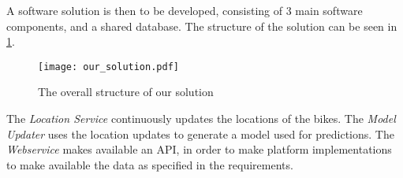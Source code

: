 A software solution is then to be developed, consisting of 3 main software components, and a shared database.
The structure of the solution can be seen in \cref{fig:solution_structure}.

\begin{figure}[h]
\texttt{[image: our\_solution.pdf]}
\caption{The overall structure of our solution}
\label{fig:solution_structure}
\end{figure}

The \textit{Location Service} continuously updates the locations of the bikes.
The \textit{Model Updater} uses the location updates to generate a model used for predictions.
The \textit{Webservice} makes available an API, in order to make platform implementations to make available the data as specified in the requirements.
